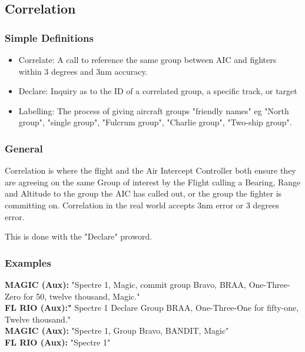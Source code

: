 \subsection{Correlation}

\subsubsection*{Simple Definitions}

\begin{itemize}

  \item Correlate: A call to reference the same group between AIC and fighters
    within 3 degrees and 3nm accuracy.

  \item Declare: Inquiry as to the ID of a correlated group, a specific track,
    or target

  \item Labelling: The process of giving aircraft groups "friendly names" eg
    "North group", "single group", "Fulcrum group", "Charlie group", "Two-ship
    group".

\end{itemize}

\subsubsection*{General}

Correlation is where the flight and the Air Intercept Controller both ensure
they are agreeing on the same Group of interest by the Flight calling a
Bearing, Range and Altitude to the group the AIC has called out, or the group
the fighter is committing on. Correlation in the real world accepts 3nm error
or 3 degrees error.

This is done with the "Declare" proword.


\subsubsection*{Examples}

\textbf{MAGIC (Aux):} "Spectre 1, Magic, commit group Bravo, BRAA,
One-Three-Zero for 50, twelve thousand, Magic." \\
\textbf{FL RIO (Aux):"} Spectre 1 Declare Group BRAA, One-Three-One for
fifty-one, Twelve thousand."\\
\textbf{MAGIC (Aux):} "Spectre 1, Group Bravo, BANDIT, Magic"\\
\textbf{FL RIO (Aux):} "Spectre 1"

